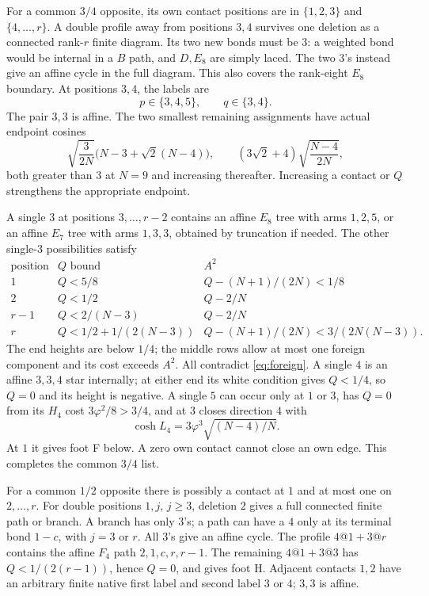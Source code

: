 \documentclass[11pt]{article}
\theoremstyle{remark}
\newcommand{\ph}{\varphi}
\begin{document}
For a common \(3/4\) opposite, its own contact positions are in
\(\{1,2,3\}\) and \(\{4,\ldots,r\}\). A double profile away from
positions \(3,4\) survives one deletion as a connected rank-\(r\)
finite diagram. Its two new bonds must be \(3\): a weighted bond
would be internal in a \(B\) path, and \(D,E_8\) are simply laced.
The two \(3\)'s instead give an affine cycle in the full diagram.
This also covers the rank-eight \(E_8\) boundary.
At positions \(3,4\), the labels are
\[
 p\in\{3,4,5\},\qquad q\in\{3,4\}.
\]
The pair \(3,3\) is affine. The two smallest remaining assignments
have actual endpoint cosines
\begin{equation}\label{eq:Acentral}
 \sqrt{\frac3{2N}}\bigl(N-3+\sqrt2(N-4)\bigr),\qquad
 (3\sqrt2+4)\sqrt{\frac{N-4}{2N}},
\end{equation}
both greater than \(3\) at \(N=9\) and increasing thereafter.
Increasing a contact or \(Q\) strengthens the appropriate endpoint.

A single \(3\) at positions \(3,\ldots,r-2\) contains an affine
\(E_8\) tree with arms \(1,2,5\), or an affine \(E_7\) tree with
arms \(1,3,3\), obtained by truncation if needed. The other
single-\(3\) possibilities satisfy
\[
\begin{array}{c|c|c}
 \text{position}&Q\text{ bound}&A^2\\ \hline
 1&Q<5/8&Q-(N+1)/(2N)<1/8\\
 2&Q<1/2&Q-2/N\\
 r-1&Q<2/(N-3)&Q-2/N\\
 r&Q<1/2+1/(2(N-3))&
          Q-(N+1)/(2N)<3/(2N(N-3)).
\end{array}
\]
The end heights are below \(1/4\); the middle rows allow at most
one foreign component and its cost exceeds \(A^2\). All contradict
\eqref{eq:foreign}. A single \(4\) is an affine \(3,3,4\) star
internally; at either end its white condition gives \(Q<1/4\),
so \(Q=0\) and its height is negative. A single \(5\) can occur
only at \(1\) or \(3\), has \(Q=0\) from its \(H_4\) cost
\(3\ph^2/8>3/4\), and at \(3\) closes direction \(4\) with
\begin{equation}\label{eq:Aiso5central}
 \cosh L_4=3\ph^3\sqrt{(N-4)/N}.
\end{equation}
At \(1\) it gives foot F below. A zero own contact cannot close
an own edge. This completes the common \(3/4\) list.

For a common \(1/2\) opposite there is possibly a contact at \(1\)
and at most one on \(2,\ldots,r\). For double positions \(1,j\),
\(j\ge3\), deletion \(2\) gives a full connected finite path or
branch. A branch has only \(3\)'s; a path can have a \(4\) only
at its terminal bond \(1-c\), with \(j=3\) or \(r\). All \(3\)'s
give an affine cycle. The profile \(4@1+3@r\) contains the affine
\(F_4\) path \(2,1,c,r,r-1\). The remaining \(4@1+3@3\) has
\(Q<1/(2(r-1))\), hence \(Q=0\), and gives foot H.
Adjacent contacts \(1,2\) have an arbitrary finite native first
label and second label \(3\) or \(4\); \(3,3\) is affine.
\end{document}
